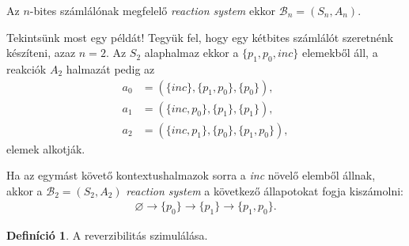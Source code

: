 \documentclass[12pt]{article}
\theoremstyle{definition}
\newtheorem*{definition*}{Definíció}
\theoremstyle{remark}
\theoremstyle{plain}
\let\emptyset\varnothing
\begin{document}
    Az $n$-bites számlálónak megfelelő \textit{reaction system} ekkor $\mathcal{B}_{n}=(S_{n}, A_{n})$.

    Tekintsünk most egy példát! Tegyük fel, hogy egy kétbites számlálót szeretnénk készíteni, azaz $n = 2$. Az $S_{2}$ alaphalmaz ekkor a $\{p_{1}, p_{0}, \textit{inc}\}$ elemekből áll, a reakciók $A_{2}$ halmazát pedig az
    \begin{align*}
        a_{0} &= (\{ \textit{inc} \}, \{ p_{1}, p_{0} \}, \{ p_{0} \} ), \\
        a_{1} &= (\{ \textit{inc}, p_{0} \}, \{ p_{1} \}, \{ p_{1} \} ), \\
        a_{2} &= (\{ \textit{inc}, p_{1} \}, \{ p_{0} \}, \{ p_{1}, p_{0} \} ),
    \end{align*}
    elemek alkotják.

    Ha az egymást követő kontextushalmazok sorra a \textit{inc} növelő elemből állnak, akkor a $\mathcal{B}_{2} = (S_{2}, A_{2})$ \textit{reaction system} a következő állapotokat fogja kiszámolni:
    \begin{align*}
        \emptyset \rightarrow \{p_{0}\} \rightarrow \{p_{1}\} \rightarrow \{p_{1}, p_{0}\}.
    \end{align*}
    \begin{definition*}
        A reverzibilitás szimulálása.
    \end{definition*}
\end{document}
